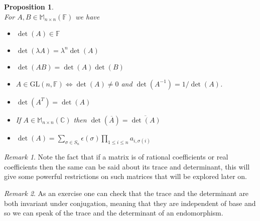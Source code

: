 \documentclass[12pt]{article}
\newtheorem{prop}[theorem]{Proposition}
\theoremstyle{definition}
\theoremstyle{remark}
\newtheorem*{remark}{Remark}
\theoremstyle{plain}
\begin{document}
\begin{prop}\leavevmode \\ For $A,B \in \mathbb{M}_{n\times n}(\mathbb{F})$ we have
\begin{itemize}
	\item $ \det(A)\in \mathbb{F} $
	\item $\det(\lambda A)=\lambda^n \det(A)$
	\item $ \det(AB)=\det(A)\det(B) $
	\item $ A \in \mathrm{GL}(n,\mathbb{F}) \iff \det(A)\neq 0$ and $\det(A^{-1})={1}/{\det(A)}$.
	\item $ \det(A^{T})=\det(A) $
	\item If $ A\in \mathbb{M}_{n\times n}(\mathbb{C}) $ then $ \det(\overline{A})=\overline{\det(A)} $
	\item $ \det(A)=\sum\limits_{\sigma \in S_n}\epsilon(\sigma)\prod\limits_{1\leq i \leq n}a_{i,\sigma(i)} $
\end{itemize}
\end{prop}
\begin{remark}
Note the fact that if a matrix is of rational coefficients or real coefficients then the same can be said about its trace and determinant, this will give some powerful restrictions on such matrices that will be explored later on.
\end{remark}
\begin{remark}
As an exercise one can check that the trace and the determinant are both invariant under conjugation, meaning that they are independent of base and so we can speak of the trace and the determinant of an endomorphism.
\end{remark}
\newpage
\end{document}
